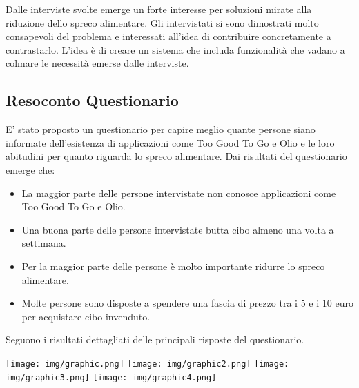 \documentclass{article}
\begin{document}
Dalle interviste svolte emerge un forte interesse per soluzioni mirate alla riduzione dello spreco alimentare. 
Gli intervistati si sono dimostrati molto consapevoli del problema e interessati all’idea di contribuire concretamente a contrastarlo.
\newline
L'idea è di creare un sistema che includa funzionalità che vadano a colmare le necessità emerse dalle interviste.

\subsection{Resoconto Questionario}
E' stato proposto un questionario per capire meglio quante persone siano informate dell'esistenza di applicazioni come Too Good To Go e Olio e le loro abitudini per quanto riguarda lo spreco alimentare.
\newline
Dai risultati del questionario emerge che:
\begin{itemize}
    \item La maggior parte delle persone intervistate non conosce applicazioni come Too Good To Go e Olio.
    \item Una buona parte delle persone intervistate butta cibo almeno una volta a settimana.
    \item Per la maggior parte delle persone è molto importante ridurre lo spreco alimentare.
    \item Molte persone sono disposte a spendere una fascia di prezzo tra i 5 e i 10 euro per acquistare cibo invenduto.
\end{itemize}
Seguono i risultati dettagliati delle principali risposte del questionario.

\begin{center}
    \texttt{[image: img/graphic.png]} \texttt{[image: img/graphic2.png]}
    \texttt{[image: img/graphic3.png]} \texttt{[image: img/graphic4.png]}
\end{center}
\end{document}
